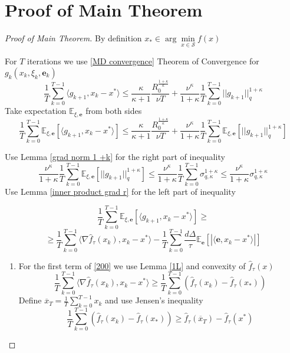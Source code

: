 \documentclass{article}
\theoremstyle{definition}
\theoremstyle{remark}
\def\EE{\mathbb{E}}
\begin{document}
\section{Proof of Main Theorem}
\begin{proof}[Proof of Main Theorem]
By definition $x_* \in \arg\min\limits_{x \in \mathcal{S}} f(x)$

For $T$ iterations we use \ref{MD convergence} Theorem of Convergence for $g_k(x_k, \xi_k, \mathbf{e}_k)$
$$\frac1T \sum \limits_{k=0}^{T-1} \langle g_{k+1}, x_k  -x^* \rangle \leq \frac{\kappa}{\kappa +1} \frac{R_0^{\frac{1+\kappa}{\kappa}} }{\nu T} + \frac{\nu^{\kappa}}{1+\kappa} \frac{1}{T} \sum \limits_{k=0}^{T-1} ||g_{k+1}||^{1+\kappa}_q$$
Take  expectation $\EE_{\xi, \mathbf{e}}$ from both sides
$$\frac1T \sum \limits_{k=0}^{T-1} \EE_{\xi, \mathbf{e}}\left[  \langle g_{k+1}, x_k  -x^* \rangle\right] \leq \frac{\kappa}{\kappa +1} \frac{R_0^{\frac{1+\kappa}{\kappa}} }{\nu T} + \frac{\nu^{\kappa}}{1+\kappa}\frac{1}{T} \sum \limits_{k=0}^{T-1}\EE_{\xi, \mathbf{e}}\left[||g_{k+1}||^{1+\kappa}_q \right]$$

Use Lemma \ref{grad norm 1 +k} for the right part of inequality
$$\frac{\nu^{\kappa}}{1+\kappa}\frac{1}{T} \sum \limits_{k=0}^{T-1}\EE_{\xi, \mathbf{e}}\left[||g_{k+1}||^{1+\kappa}_q \right] \leq \frac{\nu^{\kappa}}{1+\kappa}\frac{1}{T} \sum \limits_{k=0}^{T-1} \sigma_{q,\kappa}^{1+\kappa} \leq \frac{\nu^{\kappa}}{1+\kappa}\sigma_{q,\kappa}^{1+\kappa} $$
Use Lemma \ref{inner product grad r} for the left part of inequality

$$\frac1T \sum \limits_{k=0}^{T-1} \EE_{\xi, \mathbf{e}}\left[  \langle g_{k+1}, x_k  -x^* \rangle\right] \geq$$
\begin{equation}\label{200}
\geq \frac1T \sum \limits_{k=0}^{T-1}\langle \nabla \hat{f}_\tau(x_{k}) , x_k  -x^* \rangle - \frac1T \sum \limits_{k=0}^{T-1}\frac{d \Delta}{\tau}\EE_\mathbf{e} [|\langle \mathbf{e}, x_k  -x^* \rangle|]
\end{equation}
\begin{enumerate}
    \item 

For the first term of \ref{200} we use Lemma \ref{1L} and convexity of $\hat{f}_\tau(x)$
$$\frac1T \sum \limits_{k=0}^{T-1}\langle \nabla \hat{f}_\tau(x_{k}) , x_k  -x^* \rangle \geq \frac1T \sum \limits_{k=0}^{T-1} \left( \hat{f}_\tau(x_k) - \hat{f}_\tau(x_*)\right)$$
Define $\overline{x}_T  = \frac1T \sum \limits_{k=0}^{T-1} x_k$ and use Jensen's inequality
$$\frac1T \sum \limits_{k=0}^{T-1} \left( \hat{f}_\tau(x_k) - \hat{f}_\tau(x_*)\right) \geq \hat{f}_\tau(\overline{x}_T) - \hat{f}_\tau(x^*)$$


\end{enumerate}
\end{proof}
\end{document}
